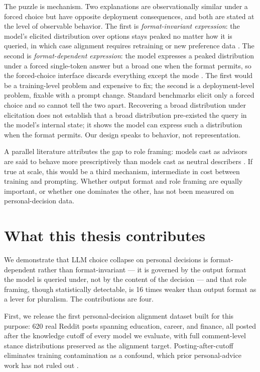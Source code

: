 The puzzle is mechanism. Two explanations are observationally similar
under a forced choice but have opposite deployment consequences, and
both are stated at the level of observable behavior. The first is
\emph{format-invariant expression}: the model's elicited distribution
over options stays peaked no matter how it is queried, in which case
alignment requires retraining or new preference data
\citep{kirk-2024-rlhf-diversity}. The second is \emph{format-dependent
expression}: the model expresses a peaked distribution under a forced
single-token answer but a broad one when the format permits, so the
forced-choice interface discards everything except the mode
\citep{zhang-2025-verbalized-sampling}. The first would be a
training-level problem and expensive to fix; the second is a
deployment-level problem, fixable with a prompt change. Standard
benchmarks elicit only a forced choice and so cannot tell the two
apart. Recovering a broad distribution under elicitation does not
establish that a broad distribution pre-existed the query in the
model's internal state; it shows the model can express such a
distribution when the format permits. Our design speaks to behavior,
not representation.

A parallel literature attributes the gap to role framing: models cast
as advisors are said to behave more prescriptively than models cast as
neutral describers \citep{russo-2026-pluralistic}. If true at scale,
this would be a third mechanism, intermediate in cost between training
and prompting. Whether output format and role framing are equally
important, or whether one dominates the other, has not been measured
on personal-decision data.

\section{What this thesis contributes}
\label{sec:contributions}

We demonstrate that LLM choice collapse on personal decisions is
format-dependent rather than format-invariant --- it is governed by the
output format the model is queried under, not by the content of the
decision --- and that role framing, though statistically detectable, is
16 times weaker than output format as a lever for pluralism. The
contributions are four.

First, we release the first personal-decision alignment dataset built
for this purpose: 620 real Reddit posts spanning education, career,
and finance, all posted after the knowledge cutoff of every model we
evaluate, with full comment-level stance distributions preserved as
the alignment target. Posting-after-cutoff eliminates training
contamination as a confound, which prior personal-advice work has not
ruled out \citep{sachdeva-2025-aita}.

